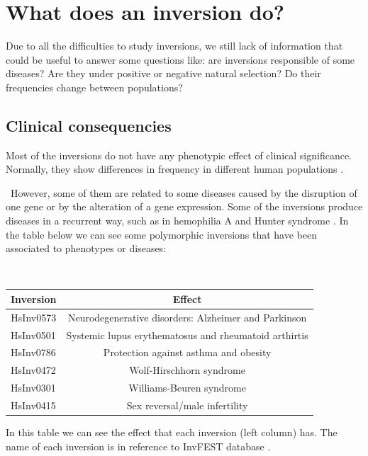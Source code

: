 \documentclass[a4paper,12pt]{article}
\begin{document}
\section{What does an inversion do?}
Due to all the difficulties to study inversions, we still lack of information that could be useful to answer some questions like: are inversions responsible of some diseases? Are they under positive or negative natural selection? Do their frequencies change between populations?

\subsection{Clinical consequencies}
Most of the inversions do not have any phenotypic effect of clinical significance. Normally, they show differences in frequency in different human populations \cite{puig_human_2015}. 

\
However, some of them are related to some diseases caused by the disruption of one gene or by the alteration of a gene expression. Some of the inversions produce diseases in a recurrent way, such as in hemophilia A and Hunter syndrome \cite{puig_human_2015}. In the table below we can see some polymorphic inversions that have been associated to phenotypes or diseases:

\

\begin{table}[!htb] %
\centering
\begin{tabular}{|l|c|}
\hline
\multicolumn{1}{|c|}{\textbf{Inversion}} & \textbf{Effect}                                       \\ \hline
\multicolumn{1}{|c|}{HsInv0573}          & Neurodegenerative disorders: Alzheimer and Parkinson  \\ \hline
HsInv0501                                & Systemic lupus erythematosus and rheumatoid arthirtis \\ \hline
HsInv0786                                & Protection against asthma and obesity                 \\ \hline
HsInv0472                                & Wolf-Hirschhorn syndrome                              \\ \hline
HsInv0301                                & Williams-Beuren syndrome                              \\ \hline
HsInv0415                                & Sex reversal/male infertility                         \\ \hline
\end{tabular}
\begin{tablenotes}
\small
\item In this table we can see the effect that each inversion (left column) has. The name of each inversion is in reference to InvFEST database \cite{martinez-fundichely_invfest_2014}.
\end{tablenotes}
\end{table}
\end{document}
